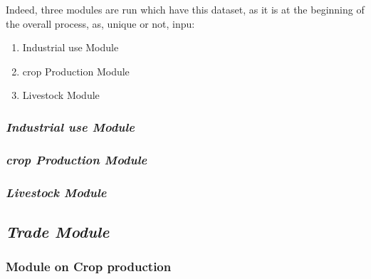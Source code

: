 \documentclass[]{article}
\providecommand{\tightlist}{%
  \setlength{\itemsep}{0pt}\setlength{\parskip}{0pt}}
\begin{document}
Indeed, three modules are run which have this dataset, as it is at the
beginning of the overall process, as, unique or not, inpu:

\begin{enumerate}
\def\labelenumi{\arabic{enumi}.}
\tightlist
\item
  Industrial use Module
\item
  crop Production Module
\item
  Livestock Module
\end{enumerate}

\subsubsection{\texorpdfstring{\emph{Industrial use
Module}}{Industrial use Module}}\label{industrial-use-module}

\subsubsection{\texorpdfstring{\emph{crop Production
Module}}{crop Production Module}}\label{crop-production-module}

\subsubsection{\texorpdfstring{\emph{Livestock
Module}}{Livestock Module}}\label{livestock-module}

\subsection{\texorpdfstring{\emph{Trade
Module}}{Trade Module}}\label{trade-module}

\subsubsection{Module on Crop
production}\label{module-on-crop-production}
\end{document}
